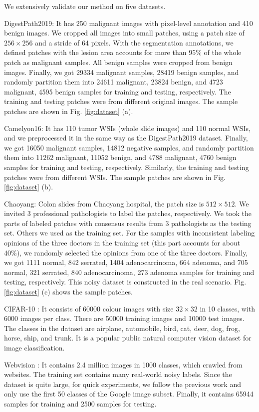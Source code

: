 We extensively validate our method on {five} datasets. 
\begin{enumerate}
\item DigestPath2019: It has 250 malignant images with pixel-level annotation and 410 benign images. We cropped all images into small patches, using a patch size of $256 \times 256$ and a stride of 64 pixels. {With the segmentation annotations, we defined patches with the lesion area accounts for more than $95\%$ of the whole patch as malignant samples. All benign samples were cropped from benign images.} Finally, we got 29334 malignant samples, 28419 benign samples, and randomly partition them into 24611 malignant, 23824 benign, and 4723 malignant, 4595 benign samples for training and testing, respectively. The training and testing patches were from different original images. The sample patches are shown in Fig. \ref{fig:dataset} (a).
\item Camelyon16: It has 110 tumor WSIs (whole slide images) and 110 normal WSIs, and we preprocessed it in the same way as the DigestPath2019 dataset. Finally, we got 16050 malignant samples, 14812 negative samples, and randomly partition them into 11262 malignant, 11052 benign, and 4788 malignant, 4760 benign samples for training and testing, respectively. Similarly, the training and testing patches were from different WSIs. The sample patches are shown in Fig. \ref{fig:dataset} (b).
\item Chaoyang: Colon slides from Chaoyang hospital, the patch size is $512 \times 512$. We invited 3 professional pathologists to label the patches, respectively. We took the parts of labeled patches with consensus results from 3 pathologists as the testing set. Others we used as the training set. For the samples with inconsistent labeling opinions of the three doctors in the training set {(this part accounts for about 40\%)}, we randomly selected the opinions from one of the three doctors. Finally, we got 1111 normal, 842 serrated, 1404 adenocarcinoma, 664 adenoma, and 705 normal, 321 serrated, 840 adenocarcinoma, 273 adenoma samples for training and testing, respectively. This noisy dataset is constructed in the real scenario. Fig. \ref{fig:dataset} (c) shows the sample patches.
{
\item CIFAR-10 \cite{2009Learning}: It consists of 60000 colour images with size $32 \times 32$ in 10 classes, with 6000 images per class. There are 50000 training images and 10000 test images. The classes in the dataset are airplane, automobile, bird, cat, deer, dog, frog, horse, ship, and trunk. It is a popular public natural computer vision dataset for image classification.
}
{\item Webvision \cite{2017WebVision}: It contains 2.4 million images in 1000 classes, which crawled from websites. The training set contains many real-world noisy labels. Since the dataset is quite large, for quick experiments, we follow the previous work\cite{chen2019understanding} and only use the first 50 classes of the Google image subset. Finally, it contains 65944 samples for training and 2500 samples for testing.
}
\end{enumerate}

